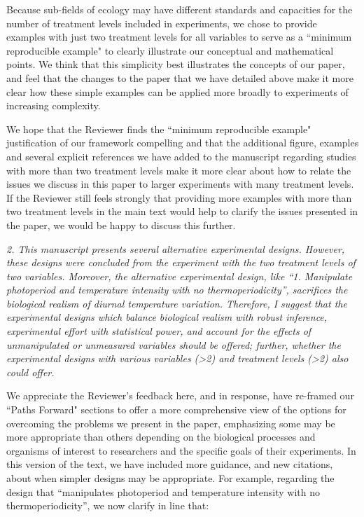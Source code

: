 \documentclass[11pt]{article}
\begin{document}
Because sub-fields of ecology may have different standards and capacities for the number of treatment levels included in experiments, we chose to provide examples with just two treatment levels for all variables to serve as a ``minimum reproducible example" to clearly illustrate our conceptual and mathematical points. We think that this simplicity best illustrates the concepts of our paper, and feel that the changes to the paper that we have detailed above make it more clear how these simple examples can be applied more broadly to experiments of increasing complexity. 

We hope that the Reviewer finds the ``minimum reproducible example" justification of our framework compelling and that the additional figure, examples and several explicit references we have added to the manuscript regarding studies with more than two treatment levels make it more clear about how to relate the issues we discuss in this paper to larger experiments with many treatment levels. If the Reviewer still feels strongly that providing more examples with more than two treatment levels in the main text would help to clarify the issues presented in the paper, we would be happy to discuss this further.

\emph{2. This manuscript presents several alternative experimental designs. However, these designs were concluded from the experiment with the two treatment levels of two variables. Moreover, the alternative experimental design, like “1. Manipulate photoperiod and temperature intensity with no thermoperiodicity”, sacrifices the biological realism of diurnal temperature variation. Therefore, I suggest that the experimental designs which balance biological realism with robust inference, experimental effort with statistical power, and account for the effects of unmanipulated or unmeasured variables should be offered; further, whether the experimental designs with various variables (>2) and treatment levels (>2) also could offer.}

We appreciate the Reviewer's feedback here, and in response, have re-framed our ``Paths Forward" sections to offer a more comprehensive view of the options for overcoming the problems we present in the paper, emphasizing some may be more appropriate than others depending on the biological processes and organisms of interest to researchers and the specific goals of their experiments. In this version of the text, we have included more guidance, and new citations, about when simpler designs may be appropriate.
For example, regarding the design that ``manipulates photoperiod and temperature intensity with no thermoperiodicity”, we now clarify in line  that:
\end{document}
